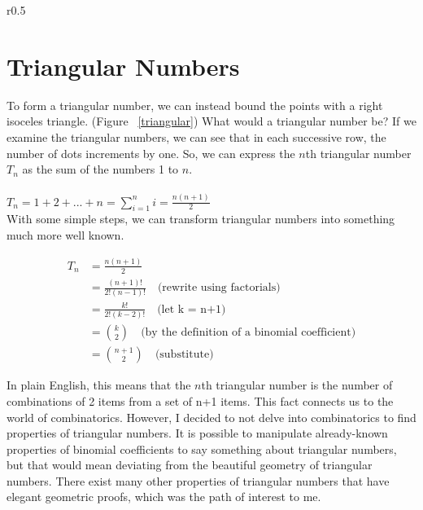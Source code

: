 \documentclass{article}
\begin{document}
\begin{wrapfigure}{r}{0.5\textwidth}
\centering
{}
\caption{$T_3 = 6$\label{triangular}}
\end{wrapfigure}
\section{Triangular Numbers}
To form a triangular number, we can instead bound the points with a right isoceles triangle. (Figure ~\ref{triangular})
What would a triangular number be?
If we examine the triangular numbers, we can see that in each successive row, the number of dots increments by one. So, we can express the $n$th triangular number $T_n$ as the sum of the numbers 1 to $n$.\\
\\
$T_n = 1+2+...+n = \sum_{i = 1}^n i = \frac{n(n+1)}{2}$\\

With some simple steps, we can transform triangular numbers into something much more well known.

\begin{align*}
T_n &= \frac{n(n+1)}{2} \\
&= \frac{(n+1)!}{2! (n-1)!}\quad\text{(rewrite using factorials)}\\
&= \frac{k!}{2! (k-2)!} \quad\text{(let k = n+1)}\\
&= \binom{k}{2} \quad\text{(by the definition of a binomial coefficient)}\\
&= \binom{n+1}{2} \quad\text{(substitute)}
\end{align*}

In plain English, this means that the $n$th triangular number is the number of combinations of 2 items from a set of n+1 items. This fact connects us to the world of combinatorics. However, I decided to not delve into combinatorics to find properties of triangular numbers. It is possible to manipulate already-known properties of binomial coefficients to say something about triangular numbers, but that would mean deviating from the beautiful geometry of triangular numbers. There exist many other properties of triangular numbers that have elegant geometric proofs, which was the path of interest to me.\\
\end{document}
